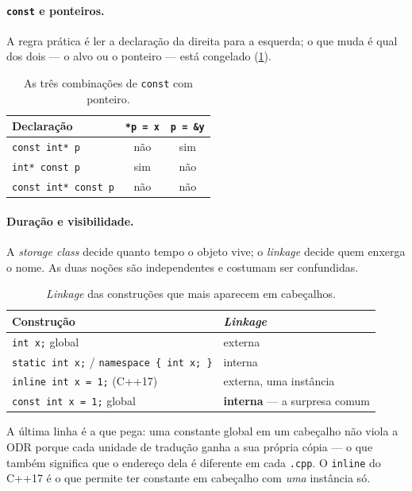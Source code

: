 \paragraph{\texttt{const} e ponteiros.} A regra prática é ler a declaração da
direita para a esquerda; o que muda é qual dos dois --- o alvo ou o ponteiro ---
está congelado (\cref{tab:const-ponteiro}).

\begin{table}[htbp]
\centering
\caption{As três combinações de \texttt{const} com ponteiro.}
\label{tab:const-ponteiro}
\footnotesize
\begin{tabular}{@{}lcc@{}}
\toprule
\textbf{Declaração} & \texttt{*p = x} & \texttt{p = \&y} \\
\midrule
\texttt{const int* p}       & não & sim \\
\texttt{int* const p}       & sim & não \\
\texttt{const int* const p} & não & não \\
\bottomrule
\end{tabular}
\end{table}

\paragraph{Duração e visibilidade.} A \emph{storage class} decide quanto tempo
o objeto vive; o \emph{linkage} decide quem enxerga o nome. As duas noções são
independentes e costumam ser confundidas.

\begin{table}[htbp]
\centering
\caption{\emph{Linkage} das construções que mais aparecem em cabeçalhos.}
\label{tab:linkage}
\footnotesize
\begin{tabular}{@{}ll@{}}
\toprule
\textbf{Construção} & \textbf{\emph{Linkage}} \\
\midrule
\texttt{int x;} global                                   & externa \\
\texttt{static int x;} / \texttt{namespace \{ int x; \}} & interna \\
\texttt{inline int x = 1;} (C++17)                       & externa, uma instância \\
\texttt{const int x = 1;} global                         & \textbf{interna} --- a surpresa comum \\
\bottomrule
\end{tabular}
\end{table}

A última linha é a que pega: uma constante global em um cabeçalho não viola a
ODR porque cada unidade de tradução ganha a sua própria cópia --- o que também
significa que o endereço dela é diferente em cada \texttt{.cpp}. O
\texttt{inline} do C++17 é o que permite ter constante em cabeçalho com
\emph{uma} instância só.

